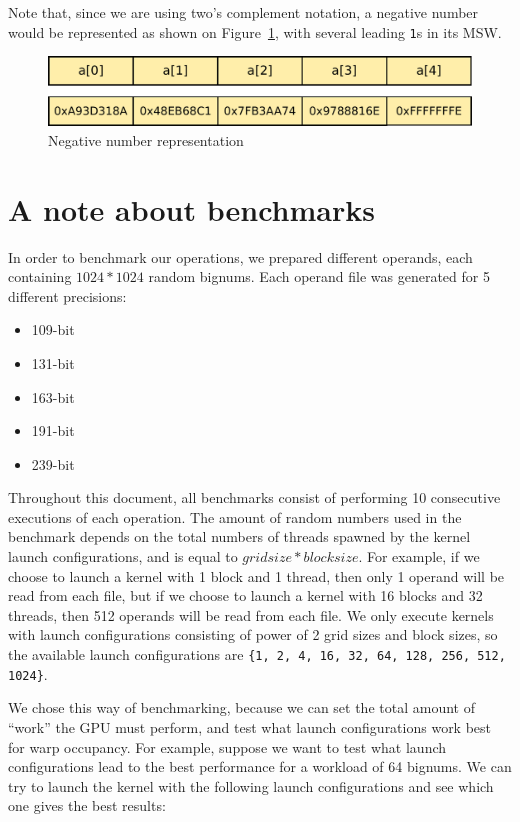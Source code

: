 \documentclass[10pt, a4paper]{report}
\begin{document}
Note that, since we are using two's complement notation, a negative number would
be represented as shown on Figure~\ref{fig:negative_number_representation}, with
several leading \verb+1+s in its MSW.

\begin{figure}[h]
\centering
\includegraphics[scale=0.5]{figs/negative_number_representation}
\caption{Negative number representation}
\label{fig:negative_number_representation}
\end{figure}

\section{A note about benchmarks}
In order to benchmark our operations, we prepared different operands, each
containing $1024*1024$ random bignums.
Each operand file was generated for 5 different precisions:

\begin{itemize}
\item 109-bit
\item 131-bit
\item 163-bit
\item 191-bit
\item 239-bit
\end{itemize}

Throughout this document, all benchmarks consist of performing 10 consecutive
executions of each operation.
The amount of random numbers used in the benchmark depends on the total numbers
of threads spawned by the kernel launch configurations, and is equal to
$gridsize*blocksize$.
For example, if we choose to launch a kernel with 1 block and 1 thread, then
only 1 operand will be read from each file, but if we choose to launch a kernel
with 16 blocks and 32 threads, then 512 operands will be read from each file.
We only execute kernels with launch configurations consisting of power of 2
grid sizes and block sizes, so the available launch configurations are
\verb+{1, 2, 4, 16, 32, 64, 128, 256, 512, 1024}+.

We chose this way of benchmarking, because we can set the total amount of
``work'' the GPU must perform, and test what launch configurations work best for
warp occupancy.
For example, suppose we want to test what launch configurations lead to the best
performance for a workload of 64 bignums.
We can try to launch the kernel with the following launch configurations and see
which one gives the best results:
\end{document}
